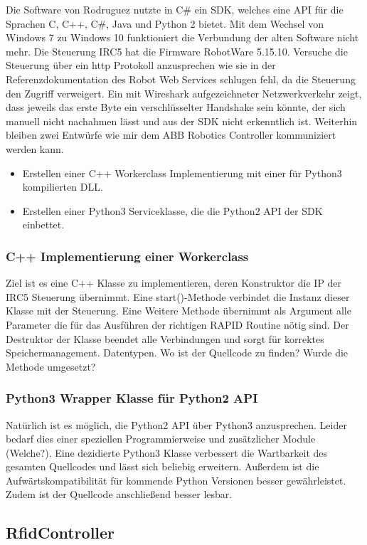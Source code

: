 Die Software von Rodruguez nutzte in C\# ein SDK, welches eine API für die Sprachen C, C++, C\#, Java und Python 2 bietet. 
Mit dem Wechsel von Windows 7 zu Windows 10 funktioniert die Verbundung der alten Software nicht mehr. Die Steuerung IRC5 hat die Firmware RobotWare 5.15.10. 
Versuche die Steuerung über ein http Protokoll anzusprechen wie sie in der Referenzdokumentation des Robot Web Services \cite{RWS} schlugen fehl, da die Steuerung den Zugriff verweigert. 
Ein mit Wireshark aufgezeichneter Netzwerkverkehr zeigt, dass jeweils das erste Byte ein verschlüsselter Handshake sein könnte, der sich manuell nicht nachahmen lässt und aus der SDK nicht erkenntlich ist. 
Weiterhin bleiben zwei Entwürfe wie mir dem ABB Robotics Controller kommuniziert werden kann. 
\begin{itemize}
    \item Erstellen einer C++ Workerclass Implementierung mit einer für Python3 kompilierten DLL. 
    \item Erstellen einer Python3 Serviceklasse, die die Python2 API der SDK einbettet.
\end{itemize}
\subsubsection*{C++ Implementierung einer Workerclass}
Ziel ist es eine C++ Klasse zu implementieren, deren Konstruktor die IP der IRC5 Steuerung übernimmt.
Eine start()-Methode verbindet die Instanz dieser Klasse mit der Steuerung. 
Eine Weitere Methode übernimmt als Argument alle Parameter die für das Ausführen der richtigen RAPID Routine nötig sind. 
Der Destruktor der Klasse beendet alle Verbindungen und sorgt für korrektes Speichermanagement. 
Datentypen. 
Wo ist der Quellcode zu finden?
Wurde die Methode umgesetzt?

\subsubsection*{Python3 Wrapper Klasse für Python2 API}

Natürlich ist es möglich, die Python2 API über Python3 anzusprechen. Leider bedarf dies einer speziellen Programmierweise und zusätzlicher Module (Welche?).
Eine dezidierte Python3 Klasse verbessert die Wartbarkeit des gesamten Quellcodes und lässt sich beliebig erweitern. 
Außerdem ist die Aufwärtskompatibilität für kommende Python Versionen besser gewährleistet. Zudem ist der Quellcode anschließend besser lesbar. 


\subsection*{RfidController}

